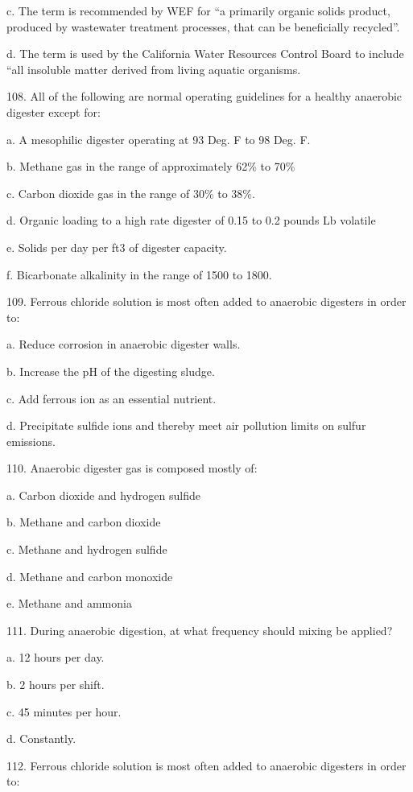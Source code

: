 \documentclass{article}
\begin{document}
c. The term is recommended by WEF for “a primarily organic solids product, produced by wastewater treatment processes, that can be beneficially recycled”. 

d. The term is used by the California Water Resources Control Board to include “all insoluble matter derived from living aquatic organisms. 


108. All of the following are normal operating guidelines for a healthy anaerobic digester except for: 

a. A mesophilic digester operating at 93 Deg. F to 98 Deg. F. 

b. Methane gas in the range of approximately 62\% to 70\% 

c. Carbon dioxide gas in the range of 30\% to 38\%. 

d. Organic loading to a high rate digester of 0.15 to 0.2 pounds Lb volatile 

e. Solids per day per ft3 of digester capacity. 

f. Bicarbonate alkalinity in the range of 1500 to 1800. 


109. Ferrous chloride solution is most often added to anaerobic digesters in order to: 

a. Reduce corrosion in anaerobic digester walls. 

b. Increase the pH of the digesting sludge. 

c. Add ferrous ion as an essential nutrient. 

d. Precipitate sulfide ions and thereby meet air pollution limits on sulfur emissions. 


110. Anaerobic digester gas is composed mostly of: 

a. Carbon dioxide and hydrogen sulfide 

b. Methane and carbon dioxide 

c. Methane and hydrogen sulfide 

d. Methane and carbon monoxide 

e. Methane and ammonia 


111. During anaerobic digestion, at what frequency should mixing be applied? 

a. 12 hours per day. 

b. 2 hours per shift. 

c. 45 minutes per hour. 

d. Constantly. 


112. Ferrous chloride solution is most often added to anaerobic digesters in order to: 
\end{document}
